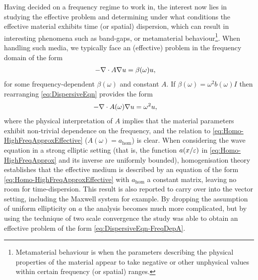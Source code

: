 Having decided on a frequency regime to work in, the interest now lies in studying the effective problem and determining under what conditions the effective material exhibits time (or spatial) dispersion, which can result in interesting phenomena such as band-gaps, or metamaterial behaviour\footnote{Metamaterial behaviour is when the parameters describing the physical properties of the material appear to take negative or other unphysical values within certain frequency (or spatial) ranges.}.
When handling such media, we typically face an (effective) problem in the frequency domain of the form
\begin{align} \label{eq:DispersiveEqn}
	-\nabla\cdot A\nabla u &= \beta(\omega)u,
\end{align}
for some frequency-dependent $\beta(\omega)$ and constant $A$.
If $\beta(\omega) = \omega^2 b(\omega)I$ then rearranging \eqref{eq:DispersiveEqn} provides the form
\begin{align} \label{eq:DispersiveEqn-FreqDepA}
	-\nabla\cdot A(\omega)\nabla u &= \omega^2 u,
\end{align}
where the physical interpretation of $A$ implies that the material parameters exhibit non-trivial dependence on the frequency, and the relation to \eqref{eq:Homo-HighFreqApproxEffective} ($A(\omega)=a_{\mathrm{hom}}$) is clear.
When considering the wave equation in a strong elliptic setting (that is, the function $a(x/\varepsilon)$ in \eqref{eq:Homo-HighFreqApprox} and its inverse are uniformly bounded), homogenisation theory establishes  that the effective medium is described by an equation of the form \eqref{eq:Homo-HighFreqApproxEffective} with $a_{\mathrm{hom}}$ a constant matrix, leaving no room for time-dispersion.
This result is also reported to carry over into the vector setting, including the Maxwell system for example.
By dropping the assumption of uniform ellipticity on $a$ the analysis becomes much more complicated, but by using the technique of two scale convergence  the study  was able to obtain an effective problem of the form \eqref{eq:DispersiveEqn-FreqDepA}.
